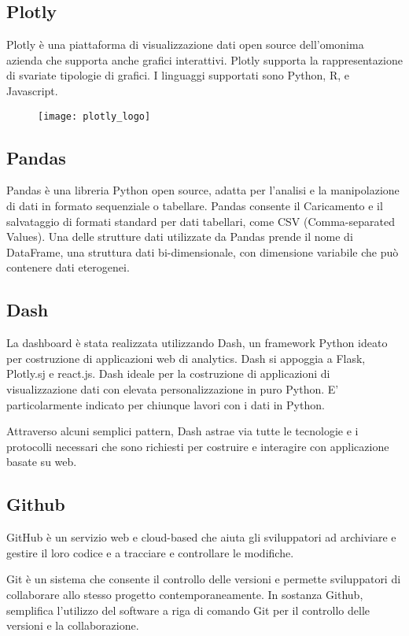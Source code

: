 \subsection{Plotly}

Plotly è una piattaforma di visualizzazione dati open source dell’omonima azienda che supporta anche grafici interattivi.
Plotly supporta la rappresentazione di svariate tipologie di grafici.
I linguaggi supportati sono Python, R, e Javascript.
\begin{figure}[htp]
    \centering
    \texttt{[image: plotly\_logo]}
\end{figure}

\subsection{Pandas}
Pandas è una libreria Python open source, adatta  per l’analisi e la manipolazione di dati in formato sequenziale o tabellare.
Pandas consente il Caricamento e il salvataggio di formati standard per dati tabellari, come CSV (Comma-separated Values).
Una delle strutture dati utilizzate da Pandas prende il nome di DataFrame, una struttura dati bi-dimensionale, con dimensione variabile che può contenere dati eterogenei.

\subsection{Dash}
La dashboard è stata realizzata utilizzando Dash, un framework Python ideato per costruzione di applicazioni web di analytics.
\noindent Dash si appoggia a Flask, Plotly.sj e react.js. Dash ideale per la costruzione di applicazioni di visualizzazione dati con elevata personalizzazione in puro Python. E’ particolarmente indicato per chiunque lavori con i dati in Python.

\noindent Attraverso alcuni semplici pattern, Dash astrae via tutte le tecnologie e i protocolli necessari che sono richiesti per costruire e interagire con applicazione basate su web.

\subsection{Github}
\noindent GitHub è un servizio web e cloud-based che aiuta gli sviluppatori ad archiviare e gestire il loro codice e a tracciare e controllare le modifiche.

\noindent Git è un sistema che consente il controllo delle versioni e permette sviluppatori di collaborare allo stesso progetto contemporaneamente.
\noindent In sostanza Github, semplifica l’utilizzo del software a riga di comando Git per il controllo delle versioni e la collaborazione.


